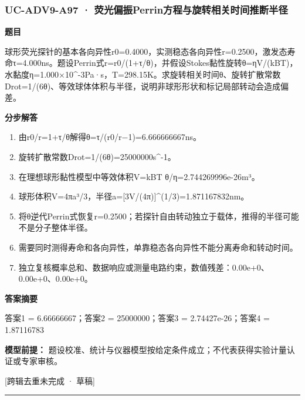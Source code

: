 \documentclass[UTF8,11pt,a4paper]{ctexart}
\begin{document}
\subsubsection*{UC-ADV9-A97 · 荧光偏振Perrin方程与旋转相关时间推断半径}
\noindent\textbf{题目}\par
球形荧光探针的基本各向异性r0=0.4000，实测稳态各向异性r=0.2500，激发态寿命τ=4.000ns。题设Perrin式r=r0/(1+τ/θ)，并假设Stokes黏性旋转θ=ηV/(kBT)，水黏度η=1.000×10\textasciicircum{}-3Pa·s，T=298.15K。求旋转相关时间θ、旋转扩散常数Drot=1/(6θ)、等效球体体积与半径，说明非球形形状和标记局部转动会造成偏差。\par
\medskip\noindent\textbf{分步解答}
\begin{enumerate}
\item 由r0/r=1+τ/θ解得θ=τ/(r0/r−1)=6.666666667ns。
\item 旋转扩散常数Drot=1/(6θ)=25000000s\textasciicircum{}-1。
\item 在理想球形黏性模型中等效体积V=kBT θ/η=2.744269996e-26m³。
\item 球形体积V=4πa³/3，半径a=[3V/(4π)]\textasciicircum{}(1/3)=1.871167832nm。
\item 将θ逆代Perrin式恢复r=0.2500；若探针自由转动独立于载体，推得的半径可能不是分子整体半径。
\item 需要同时测得寿命和各向异性，单靠稳态各向异性不能分离寿命和转动时间。
\item 独立复核概率总和、数据响应或测量电路约束，数值残差：0.00e+0、0.00e+0、0.00e+0。
\end{enumerate}
\noindent\textbf{答案摘要}\par
答案1 = 6.66666667；答案2 = 25000000；答案3 = 2.74427e-26；答案4 = 1.87116783\par
\noindent\textbf{模型前提：}
题设校准、统计与仪器模型按给定条件成立；不代表获得实验计量认证或专家审核。\par
\noindent\textcolor{red!65!black}{[跨辑去重未完成 · 草稿]} \par
\medskip\hrule\medskip
{}
\end{document}
